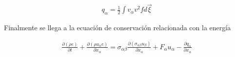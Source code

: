 \begin{eqnarray}
q_{\alpha} = \frac{1}{2}\int v_{\alpha} v^{2}f d\vec{\xi}
\end{eqnarray}

Finalmente se llega a la ecuación de conservación relacionada con la energía

\begin{eqnarray}
\boxed{
\frac{\partial (\rho e)}{\partial t} + \frac{\partial (\rho u_{\alpha}e)}{\partial x_{\alpha}}= \sigma_{\alpha\beta}\frac{\partial (\sigma_{\alpha\beta}u_{\beta})}{\partial x_{\alpha}}+ F_{\alpha}u_{\alpha}-\frac{\partial q_{\alpha}}{\partial x_{\alpha}}
}
\end{eqnarray}

\newpage









